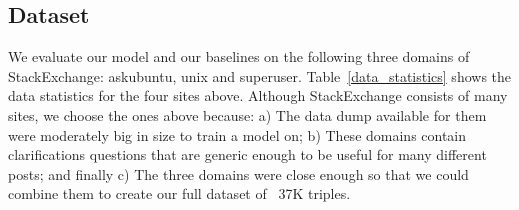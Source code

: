 \documentclass[11pt,a4paper]{article}
\begin{document}
\subsection{Dataset}\label{dataset}
We evaluate our model and our baselines on the following three domains of StackExchange: askubuntu, unix and superuser.
%
Table~\ref{data_statistics} shows the data statistics for the four sites above.  Although StackExchange consists of many sites, we choose the ones above because: a) The data dump available for them were moderately big in size to train a model on; b) These domains contain clarifications questions that are generic enough to be useful for many different posts; and finally c) The three domains were close enough so that we could combine them to create our full dataset of ~37K triples.


\end{document}
